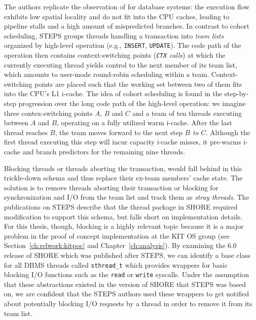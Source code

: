 \documentclass[12pt,a4paper]{book}
\begin{document}
The authors replicate the observation of \cite{cohort} for database systems: the execution flow exhibits low spatial locality and do not fit into the CPU caches, leading to pipeline stalls and a high amount of mispredicted branches.
In contrast to cohort scheduling, STEPS groups threads handling a transaction into \emph{team lists} organized by high-level operation (e.g., \texttt{INSERT}, \texttt{UPDATE}).
The code path of the operation then contains context-switching points (\textit{\texttt{CTX} calls}) at which the currently executing thread yields control to the next member of its team list, which amounts to user-mode round-robin scheduling within a team.
Context-switching points are placed such that the working set between two of them fits into the CPU's L1 i-cache.
The idea of cohort scheduling is found in the step-by-step progression over the long code path of the high-level operation:
we imagine three contex-switching points $A$, $B$ and $C$ and a team of ten threads executing between $A$ and $B$, operating on a fully utilized warm i-cache.
After the last thread reaches $B$, the team moves forward to the next step  \textit{$B$ to $C$}.
Although the first thread executing this step will incur capacity i-cache misses, it pre-warms i-cache and branch predictors for the remaining nine threads.~\cite{steps}

Blocking threads or threads aborting the transaction, would fall behind in this trickle-down schema and thus replace their ex-team members' cache state.
The solution is to remove threads aborting their transaction or blocking for synchronization and I/O from the team list and track them as \emph{stray threads}.
The publications on STEPS describe that the thread package in SHORE required modification to support this schema, but falls short on implementation details.
For this thesis, though, blocking is a highly relevant topic because it is a major problem in the proof of concept implementation at the KIT OS group (see Section~\ref{ch:relwork:kitpoc} and Chapter~\ref{ch:analysis}).
By examining the 6.0 release of SHORE which was published after STEPS, we can identify a base class for all DBMS threads called \texttt{sthread\_t} which provides wrappers for basic blocking I/O functions such as the \texttt{read} or \texttt{write} syscalls.
Under the assumption that these abstractions existed in the version of SHORE that STEPS was based on, we are confident that the STEPS authors used these wrappers to get notified about potentially blocking I/O requests by a thread in order to remove it from its team list.~\cite{shoreRelease,shore}
\end{document}
